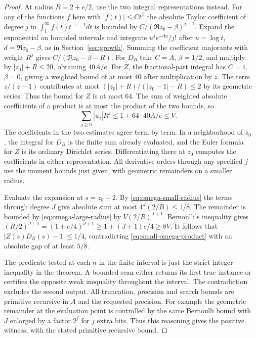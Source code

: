 \begin{proof}
At radius $R=2+e/2$, use the two integral representations instead.
For any of the functions $f$ here with $|f(t)|\le C t^\beta$ the absolute
Taylor coefficient of degree $j$ in $\int_1^\infty f(t)t^{-z-1}dt$
is bounded by $C/(\Re z_0-\beta)^{j+1}$. Expand the exponential on
bounded intervals and integrate $u^je^{-du}/j!$ after $u=\log t$,
$d=\Re z_0-\beta$, as in Section~\ref{sec:growth}. Summing the
coefficient majorants with weight $R^j$ gives $C/(\Re z_0-\beta-R)$.
For $D_B$ take $C=A$, $\beta=1/2$, and multiply by
$|z_0|+R\le20$, obtaining $40A/e$. For $Z$, the fractional-part
integral has $C=1$, $\beta=0$, giving a weighted bound of at most $40$
after multiplication by $z$. The term $z/(z-1)$ contributes at most
$(|z_0|+R)/(|z_0-1|-R)\le2$ by its geometric series. Thus the bound
for $Z$ is at most $64$. The sum of weighted absolute coefficients
of a product is at most the product of the two bounds, so
\begin{equation}\label{eq:omega-large-radius}
                       \sum_{j\ge0}|u_j|R^j\le 1+64\cdot40A/e\le V.
\end{equation}
The coefficients in the two estimates agree term by term. In a neighborhood
of $z_0$, the integral for $D_B$ is the finite sum already evaluated,
and the Euler formula for $Z$ is its ordinary Dirichlet series.
Differentiating there at $z_0$ computes the coefficients in either
representation. All derivative orders through any specified $j$ use the
moment bounds just given, with geometric remainders on a smaller radius.

Evaluate the expansion at $s=z_0-2$. By
\eqref{eq:omega-small-radius} the terms through degree $J$ give absolute
sum at most $4^J(2/B)\le1/8$. The remainder is bounded by
\eqref{eq:omega-large-radius} by $V(2/R)^{J+1}$. Bernoulli's inequality
gives $(R/2)^{J+1}=(1+e/4)^{J+1}\ge1+(J+1)e/4\ge8V$.
It follows that $|Z(s)D_B(s)-1|\le1/4$, contradicting
\eqref{eq:small-omega-product} with an absolute gap of at least $5/8$.

The predicate tested at each $n$ in the finite interval is just the strict
integer inequality in the theorem. A bounded scan either returns its first
true instance or certifies the opposite weak inequality throughout the
interval. The contradiction excludes the second output. All truncation,
precision and search bounds are primitive recursive in $A$ and the
requested precision. For example the geometric remainder at the evaluation
point is controlled by the same Bernoulli bound with $J$ enlarged by a
factor $2^j$ for $j$ extra bits. Thus this reasoning gives the positive
witness, with the stated primitive recursive bound.
\end{proof}

